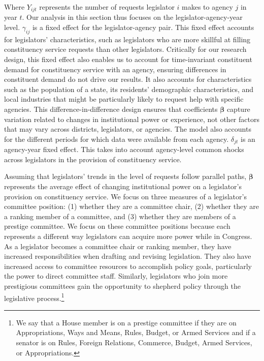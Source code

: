 \documentclass[12pt]{article}
\begin{document}
Where $Y_{ijt}$ represents the number of requests legislator $i$ makes to agency $j$ in year $t$. Our analysis in this section thus focuses on the legislator-agency-year level. $\gamma_{ij}$ is a fixed effect for the legislator-agency pair. This fixed effect accounts for legislators' characteristics, such as legislators who are more skillful at filling constituency service requests than other legislators. Critically for our research design, this fixed effect also enables us to account for time-invariant constituent demand for constituency service with an agency, ensuring differences in constituent demand do not drive our results. It also accounts for characteristics such as the population of a state, its residents' demographic characteristics, and local industries that might be particularly likely to request help with specific agencies. This difference-in-difference design ensures that coefficients $\boldsymbol{\beta}$ capture variation related to changes in institutional power or experience, not other factors that may vary across districts, legislators, or agencies. The model also accounts for the different periods for which data were available from each agency. $\delta_{jt}$ is an agency-year fixed effect. This takes into account agency-level common shocks across legislators in the provision of constituency service. 

Assuming that legislators' trends in the level of requests follow parallel paths, $\boldsymbol{\beta}$ represents the average effect of changing institutional power on a legislator's provision on constituency service. We focus on three measures of a legislator's committee position: (1) whether they are a committee chair, (2) whether they are a ranking member of a committee, and (3) whether they are members of a prestige committee. We focus on these committee positions because each represents a different way legislators can acquire more power while in Congress. As a legislator becomes a committee chair or ranking member, they have increased responsibilities when drafting and revising legislation. They also have increased access to committee resources to accomplish policy goals, particularly the power to direct committee staff. Similarly, legislators who join more prestigious committees gain the opportunity to shepherd policy through the legislative process.\footnote{We say that a House member is on a prestige committee if they are on Appropriations, Ways and Means, Rules, Budget, or Armed Services and if a senator is on Rules, Foreign Relations, Commerce, Budget, Armed Services, or Appropriations.} %
\end{document}
